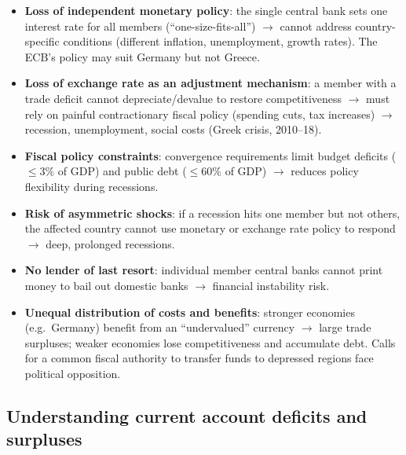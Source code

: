 \begin{itemize}
  \item \textbf{Loss of independent monetary policy}: the single central bank sets one interest rate for all members (``one-size-fits-all'') $\to$ cannot address country-specific conditions (different inflation, unemployment, growth rates). The ECB's policy may suit Germany but not Greece.
  \item \textbf{Loss of exchange rate as an adjustment mechanism}: a member with a trade deficit cannot depreciate/devalue to restore competitiveness $\to$ must rely on painful contractionary fiscal policy (spending cuts, tax increases) $\to$ recession, unemployment, social costs (Greek crisis, 2010--18).
  \item \textbf{Fiscal policy constraints}: convergence requirements limit budget deficits ($\leq 3\%$ of GDP) and public debt ($\leq 60\%$ of GDP) $\to$ reduces policy flexibility during recessions.
  \item \textbf{Risk of asymmetric shocks}: if a recession hits one member but not others, the affected country cannot use monetary or exchange rate policy to respond $\to$ deep, prolonged recessions.
  \item \textbf{No lender of last resort}: individual member central banks cannot print money to bail out domestic banks $\to$ financial instability risk.
  \item \textbf{Unequal distribution of costs and benefits}: stronger economies (e.g.\ Germany) benefit from an ``undervalued'' currency $\to$ large trade surpluses; weaker economies lose competitiveness and accumulate debt. Calls for a common fiscal authority to transfer funds to depressed regions face political opposition.
\end{itemize}
\subsection{Understanding current account deficits and surpluses}
